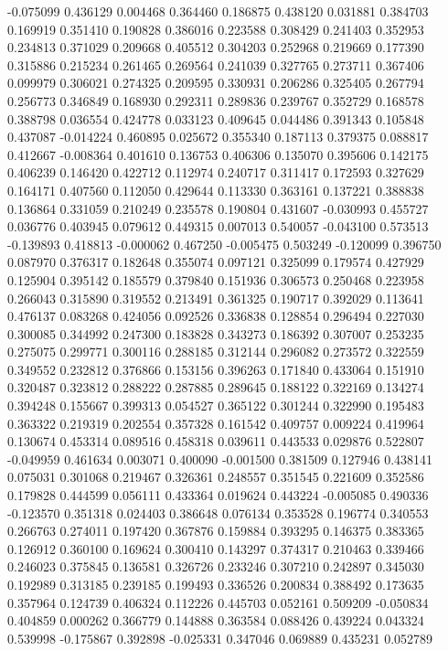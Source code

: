 -0.075099
0.436129
0.004468
0.364460
0.186875
0.438120
0.031881
0.384703
0.169919
0.351410
0.190828
0.386016
0.223588
0.308429
0.241403
0.352953
0.234813
0.371029
0.209668
0.405512
0.304203
0.252968
0.219669
0.177390
0.315886
0.215234
0.261465
0.269564
0.241039
0.327765
0.273711
0.367406
0.099979
0.306021
0.274325
0.209595
0.330931
0.206286
0.325405
0.267794
0.256773
0.346849
0.168930
0.292311
0.289836
0.239767
0.352729
0.168578
0.388798
0.036554
0.424778
0.033123
0.409645
0.044486
0.391343
0.105848
0.437087
-0.014224
0.460895
0.025672
0.355340
0.187113
0.379375
0.088817
0.412667
-0.008364
0.401610
0.136753
0.406306
0.135070
0.395606
0.142175
0.406239
0.146420
0.422712
0.112974
0.240717
0.311417
0.172593
0.327629
0.164171
0.407560
0.112050
0.429644
0.113330
0.363161
0.137221
0.388838
0.136864
0.331059
0.210249
0.235578
0.190804
0.431607
-0.030993
0.455727
0.036776
0.403945
0.079612
0.449315
0.007013
0.540057
-0.043100
0.573513
-0.139893
0.418813
-0.000062
0.467250
-0.005475
0.503249
-0.120099
0.396750
0.087970
0.376317
0.182648
0.355074
0.097121
0.325099
0.179574
0.427929
0.125904
0.395142
0.185579
0.379840
0.151936
0.306573
0.250468
0.223958
0.266043
0.315890
0.319552
0.213491
0.361325
0.190717
0.392029
0.113641
0.476137
0.083268
0.424056
0.092526
0.336838
0.128854
0.296494
0.227030
0.300085
0.344992
0.247300
0.183828
0.343273
0.186392
0.307007
0.253235
0.275075
0.299771
0.300116
0.288185
0.312144
0.296082
0.273572
0.322559
0.349552
0.232812
0.376866
0.153156
0.396263
0.171840
0.433064
0.151910
0.320487
0.323812
0.288222
0.287885
0.289645
0.188122
0.322169
0.134274
0.394248
0.155667
0.399313
0.054527
0.365122
0.301244
0.322990
0.195483
0.363322
0.219319
0.202554
0.357328
0.161542
0.409757
0.009224
0.419964
0.130674
0.453314
0.089516
0.458318
0.039611
0.443533
0.029876
0.522807
-0.049959
0.461634
0.003071
0.400090
-0.001500
0.381509
0.127946
0.438141
0.075031
0.301068
0.219467
0.326361
0.248557
0.351545
0.221609
0.352586
0.179828
0.444599
0.056111
0.433364
0.019624
0.443224
-0.005085
0.490336
-0.123570
0.351318
0.024403
0.386648
0.076134
0.353528
0.196774
0.340553
0.266763
0.274011
0.197420
0.367876
0.159884
0.393295
0.146375
0.383365
0.126912
0.360100
0.169624
0.300410
0.143297
0.374317
0.210463
0.339466
0.246023
0.375845
0.136581
0.326726
0.233246
0.307210
0.242897
0.345030
0.192989
0.313185
0.239185
0.199493
0.336526
0.200834
0.388492
0.173635
0.357964
0.124739
0.406324
0.112226
0.445703
0.052161
0.509209
-0.050834
0.404859
0.000262
0.366779
0.144888
0.363584
0.088426
0.439224
0.043324
0.539998
-0.175867
0.392898
-0.025331
0.347046
0.069889
0.435231
0.052789
